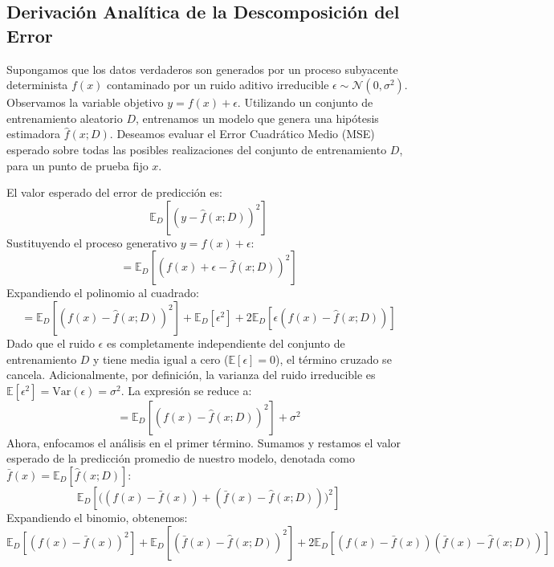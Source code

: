 \documentclass[12pt]{article}
\begin{document}
\subsection*{Derivación Analítica de la Descomposición del Error}
Supongamos que los datos verdaderos son generados por un proceso subyacente determinista $f(x)$ contaminado por un ruido aditivo irreducible $\epsilon \sim \mathcal{N}(0, \sigma^2)$. Observamos la variable objetivo $y = f(x) + \epsilon$. 
Utilizando un conjunto de entrenamiento aleatorio $D$, entrenamos un modelo que genera una hipótesis estimadora $\hat{f}(x; D)$. Deseamos evaluar el Error Cuadrático Medio (MSE) esperado sobre todas las posibles realizaciones del conjunto de entrenamiento $D$, para un punto de prueba fijo $x$.

El valor esperado del error de predicción es:
\begin{equation}
    \mathbb{E}_D\left[ (y - \hat{f}(x; D))^2 \right]
\end{equation}
Sustituyendo el proceso generativo $y = f(x) + \epsilon$:
\begin{equation}
    = \mathbb{E}_D\left[ (f(x) + \epsilon - \hat{f}(x; D))^2 \right]
\end{equation}
Expandiendo el polinomio al cuadrado:
\begin{equation}
    = \mathbb{E}_D\left[ (f(x) - \hat{f}(x; D))^2 \right] + \mathbb{E}_D[\epsilon^2] + 2\mathbb{E}_D\left[ \epsilon(f(x) - \hat{f}(x; D)) \right]
\end{equation}
Dado que el ruido $\epsilon$ es completamente independiente del conjunto de entrenamiento $D$ y tiene media igual a cero ($\mathbb{E}[\epsilon] = 0$), el término cruzado se cancela. Adicionalmente, por definición, la varianza del ruido irreducible es $\mathbb{E}[\epsilon^2] = \text{Var}(\epsilon) = \sigma^2$. La expresión se reduce a:
\begin{equation}
    = \mathbb{E}_D\left[ (f(x) - \hat{f}(x; D))^2 \right] + \sigma^2
\end{equation}
Ahora, enfocamos el análisis en el primer término. Sumamos y restamos el valor esperado de la predicción promedio de nuestro modelo, denotada como $\bar{f}(x) = \mathbb{E}_D[\hat{f}(x; D)]$:
\begin{equation}
    \mathbb{E}_D\left[ \Big( (f(x) - \bar{f}(x)) + (\bar{f}(x) - \hat{f}(x; D)) \Big)^2 \right]
\end{equation}
Expandiendo el binomio, obtenemos:
\begin{equation}
    \mathbb{E}_D\left[ (f(x) - \bar{f}(x))^2 \right] + \mathbb{E}_D\left[ (\bar{f}(x) - \hat{f}(x; D))^2 \right] + 2\mathbb{E}_D\left[ (f(x) - \bar{f}(x))(\bar{f}(x) - \hat{f}(x; D)) \right]
\end{equation}
\end{document}
